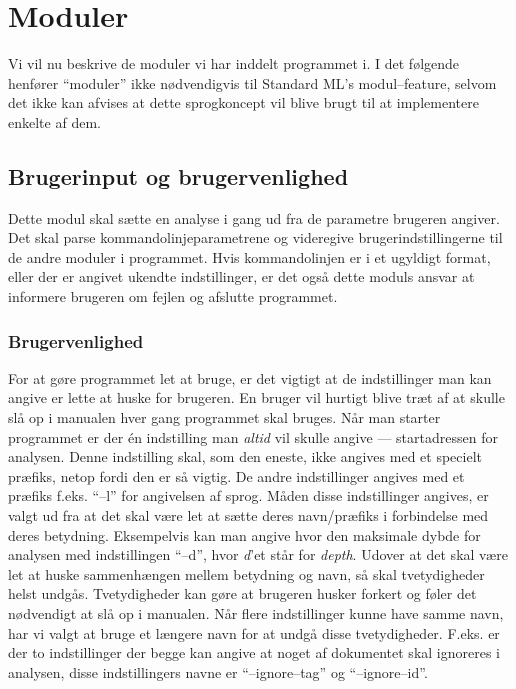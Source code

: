 \documentclass[a4paper,oneside]{memoir}
\begin{document}
\newpage
\section{Moduler}
Vi vil nu beskrive de moduler vi har inddelt programmet i. I det
følgende henfører ``moduler'' ikke nødvendigvis til Standard ML's
modul--feature, selvom det ikke kan afvises at dette sprogkoncept vil
blive brugt til at implementere enkelte af dem.

\subsection{Brugerinput og brugervenlighed}
Dette modul skal sætte en analyse i gang ud fra de parametre brugeren
angiver. Det skal parse kommandolinjeparametrene og videregive
brugerindstillingerne til de andre moduler i programmet. Hvis
kommandolinjen er i et ugyldigt format, eller der er angivet ukendte
indstillinger, er det også dette moduls ansvar at informere brugeren
om fejlen og afslutte programmet.

\subsubsection{Brugervenlighed}
For at gøre programmet let at bruge, er det vigtigt at de
indstillinger man kan angive er lette at huske for brugeren. En bruger
vil hurtigt blive træt af at skulle slå op i manualen hver gang
programmet skal bruges. Når man starter programmet er der én
indstilling man \textit{altid} vil skulle angive --- startadressen for
analysen. Denne indstilling skal, som den eneste, ikke angives med et
specielt præfiks, netop fordi den er så vigtig. De andre indstillinger
angives med et præfiks f.eks. ``--l'' for angivelsen af sprog. Måden
disse indstillinger angives, er valgt ud fra at det skal være let at
sætte deres navn/præfiks i forbindelse med deres
betydning. Eksempelvis kan man angive hvor den maksimale dybde for
analysen med indstillingen ``--d'', hvor \textit{d}'et står for
\textit{depth}. Udover at det skal være let at huske sammenhængen mellem
betydning og navn, så skal tvetydigheder helst undgås. Tvetydigheder
kan gøre at brugeren husker forkert og føler det
nødvendigt at slå op i manualen. Når flere indstillinger kunne have
samme navn, har vi valgt at bruge et længere navn for at undgå
disse tvetydigheder. F.eks. er der to indstillinger der begge kan
angive at noget af dokumentet skal ignoreres i analysen, disse
indstillingers navne er ``--ignore--tag'' og ``--ignore--id''.
\end{document}
